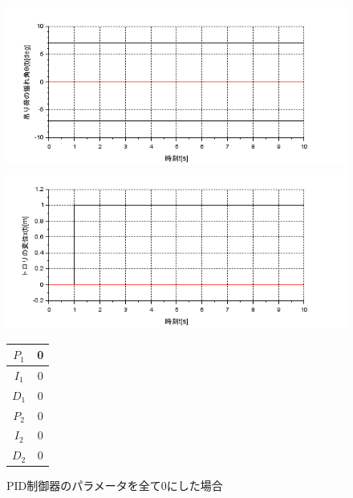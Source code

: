 \documentclass[dvipdfmx,titlepage,a4j]{jsarticle}  %
\begin{document}
\begin{figure}[H]
  \begin{minipage}{4.5cm}
    \centering
    \includegraphics[keepaspectratio, scale=0.35]{../graph/crane/ang-0.png}
  \end{minipage}
  \hfill
  \begin{minipage}{4.5cm}
    \centering
    \includegraphics[keepaspectratio, scale=0.35]{../graph/crane/po-0.png}
  \end{minipage}
  \hfill
  \begin{minipage}{3cm}
    \begin{center}
      \begin{tabular}{c|c}
        \hline
        $P_1$ & 0\\ \hline
        $I_1$ & 0\\ \hline
        $D_1$ & 0\\ \hline
        $P_2$ & 0\\ \hline
        $I_2$ & 0\\ \hline
        $D_2$ & 0\\
        \hline
      \end{tabular}
    \end{center}
  \end{minipage}
  \hfill
  \caption{PID制御器のパラメータを全て0にした場合}
  \label{fig:crane:0}
\end{figure}
\end{document}
